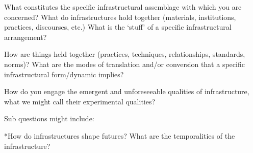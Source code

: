 \documentclass[a4,portrait,11pt]{article}
\begin{document}
\begin{flushleft}
What constitutes the specific infrastructural assemblage with which you are concerned? What do infrastructures hold together (materials, institutions, practices, discourses, etc.) What is the {`}stuff' of a specific infrastructural arrangement?
\end{flushleft}


\begin{flushleft}

\end{flushleft}


\begin{flushleft}
How are things held together (practices, techniques, relationships, standards, norms)? What are the modes of translation and/or conversion that a specific infrastructural form/dynamic implies?
\end{flushleft}


\begin{flushleft}

\end{flushleft}


\begin{flushleft}
How do you engage the emergent and unforeseeable qualities of infrastructure, what we might call their experimental qualities?
\end{flushleft}


\begin{flushleft}

\end{flushleft}


\begin{flushleft}

\end{flushleft}


\begin{flushleft}
Sub questions might include: 
\end{flushleft}


\begin{flushleft}

\end{flushleft}


\begin{flushleft}
*How do infrastructures shape futures? What are the temporalities of the infrastructure? 
\end{flushleft}


\begin{flushleft}

\end{flushleft}
\end{document}
